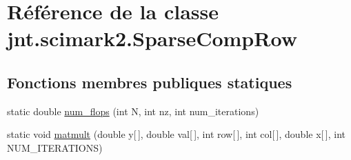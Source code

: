 \hypertarget{classjnt_1_1scimark2_1_1SparseCompRow}{\section{Référence de la classe jnt.\-scimark2.\-Sparse\-Comp\-Row}
\label{classjnt_1_1scimark2_1_1SparseCompRow}
}
\subsection*{Fonctions membres publiques statiques}
\begin{DoxyCompactItemize}
\item 
static double \hyperlink{classjnt_1_1scimark2_1_1SparseCompRow_a8728c9750af90bec93ce61aa5d9b304f}{num\-\_\-flops} (int N, int nz, int num\-\_\-iterations)
\item 
static void \hyperlink{classjnt_1_1scimark2_1_1SparseCompRow_ad63253daf63e9e95761838c6fc78b094}{matmult} (double y\mbox{[}$\,$\mbox{]}, double val\mbox{[}$\,$\mbox{]}, int row\mbox{[}$\,$\mbox{]}, int col\mbox{[}$\,$\mbox{]}, double x\mbox{[}$\,$\mbox{]}, int N\-U\-M\-\_\-\-I\-T\-E\-R\-A\-T\-I\-O\-N\-S)
\end{DoxyCompactItemize}


